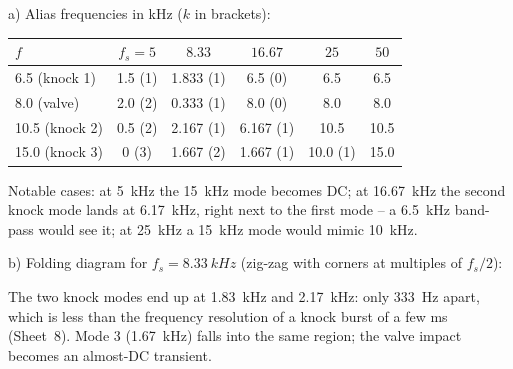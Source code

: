 \begin{solution}
a) Alias frequencies in kHz ($k$ in brackets):
\begin{center}\small
\begin{tabular}{@{}lccccc@{}}\toprule
$f$ & $f_s=5$ & $8.33$ & $16.67$ & $25$ & $50$\\\midrule
6.5 (knock 1)  & 1.5 (1) & 1.833 (1) & 6.5 (0) & 6.5 & 6.5\\
8.0 (valve)    & 2.0 (2) & 0.333 (1) & 8.0 (0) & 8.0 & 8.0\\
10.5 (knock 2) & 0.5 (2) & 2.167 (1) & 6.167 (1) & 10.5 & 10.5\\
15.0 (knock 3) & 0 (3)   & 1.667 (2) & 1.667 (1) & 10.0 (1) & 15.0\\\bottomrule
\end{tabular}
\end{center}
Notable cases: at \SI{5}{kHz} the \SI{15}{kHz} mode becomes DC; at
\SI{16.67}{kHz} the second knock mode lands at \SI{6.17}{kHz}, right next to
the first mode -- a \SI{6.5}{kHz} band-pass would see it; at \SI{25}{kHz} a
\SI{15}{kHz} mode would mimic \SI{10}{kHz}.

b) Folding diagram for $f_s=\SI{8.33}{kHz}$ (zig-zag with corners at
multiples of $f_s/2$):
\begin{center}
\end{center}
The two knock modes end up at \SI{1.83}{kHz} and \SI{2.17}{kHz}: only
\SI{333}{Hz} apart, which is less than the frequency resolution of a knock
burst of a few ms (Sheet~8). Mode 3 (\SI{1.67}{kHz}) falls into the same
region; the valve impact becomes an almost-DC transient.


\end{solution}
